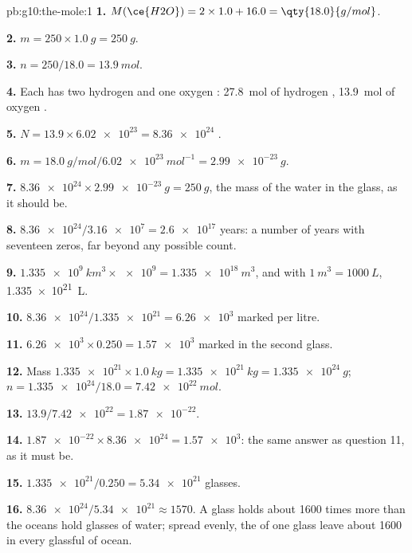 \begin{solution}{pb:g10:the-mole:1}
\textbf{1.} $M(\ce{H2O}) = 2 \times 1.0 + 16.0 = \qty{18.0}{g/mol}$.

\textbf{2.} $m = 250 \times \qty{1.0}{g} = \qty{250}{g}$.

\textbf{3.} $n = 250 / 18.0 = \qty{13.9}{mol}$.

\textbf{4.} Each  has two hydrogen  and one oxygen :
\qty{27.8}{mol} of hydrogen , \qty{13.9}{mol} of oxygen .

\textbf{5.} $N = 13.9 \times \num{6.02e23} = \num{8.36e24}$ .

\textbf{6.} $m = \qty{18.0}{g/mol} / \qty{6.02e23}{mol^{-1}} =
\qty{2.99e-23}{g}$.

\textbf{7.} $\num{8.36e24} \times \qty{2.99e-23}{g} = \qty{250}{g}$, the
mass of the water in the glass, as it should be.

\textbf{8.} $\num{8.36e24} / \num{3.16e7} = \num{2.6e17}$ years: a
number of years with seventeen zeros, far beyond any possible count.

\textbf{9.} $\qty{1.335e9}{km^3} \times \num{e9} = \qty{1.335e18}{m^3}$,
and with $\qty{1}{m^3} = \qty{1000}{L}$, \qty{1.335e21}{L}.

\textbf{10.} $\num{8.36e24} / \num{1.335e21} = \num{6.26e3}$ marked
 per litre.

\textbf{11.} $\num{6.26e3} \times 0.250 = \num{1.57e3}$ marked 
in the second glass.

\textbf{12.} Mass $\num{1.335e21} \times \qty{1.0}{kg} =
\qty{1.335e21}{kg} = \qty{1.335e24}{g}$; $n = \num{1.335e24} / 18.0 =
\qty{7.42e22}{mol}$.

\textbf{13.} $13.9 / \num{7.42e22} = \num{1.87e-22}$.

\textbf{14.} $\num{1.87e-22} \times \num{8.36e24} = \num{1.57e3}$: the
same answer as question 11, as it must be.

\textbf{15.} $\num{1.335e21} / 0.250 = \num{5.34e21}$ glasses.

\textbf{16.} $\num{8.36e24} / \num{5.34e21} \approx 1570$. A glass holds
about 1600 times more  than the oceans hold glasses of water;
spread evenly, the  of one glass leave about 1600 in every
glassful of ocean.


\end{solution}
